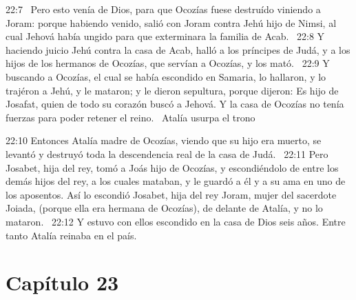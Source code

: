 																						22:7  Pero esto venía de Dios, para que Ocozías fuese destruído viniendo a Joram: porque habiendo venido, salió con Joram contra Jehú hijo de Nimsi, al cual Jehová había ungido para que exterminara la familia de Acab.  
																						22:8 Y haciendo juicio Jehú contra la casa de Acab, halló a los príncipes de Judá, y a los hijos de los hermanos de Ocozías, que servían a Ocozías, y los mató.  
																						22:9 Y buscando a Ocozías, el cual se había escondido en Samaria, lo hallaron, y lo trajéron a Jehú, y le mataron; y le dieron sepultura, porque dijeron: Es hijo de Josafat, quien de todo su corazón buscó a Jehová. Y la casa de Ocozías no tenía fuerzas para poder retener el reino.  
																						Atalía usurpa el trono  
																						
																						22:10 Entonces Atalía madre de Ocozías, viendo que su hijo era muerto, se levantó y destruyó toda la descendencia real de la casa de Judá.  
																						22:11 Pero Josabet, hija del rey, tomó a Joás hijo de Ocozías, y escondiéndolo de entre los demás hijos del rey, a los cuales mataban, y le guardó a él y a su ama en uno de los aposentos. Así lo escondió Josabet, hija del rey Joram, mujer del sacerdote Joiada, (porque ella era hermana de Ocozías), de delante de Atalía, y no lo mataron.  
																						22:12 Y estuvo con ellos escondido en la casa de Dios seis años. Entre tanto Atalía reinaba en el país.  
																						\section*{Capítulo 23 }
																							
